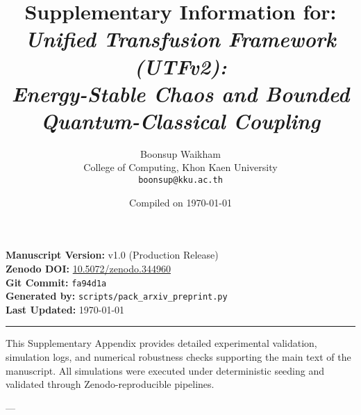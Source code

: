 
\title{\textbf{Supplementary Information for:}\\
\emph{Unified Transfusion Framework (UTFv2):\\
Energy-Stable Chaos and Bounded Quantum-Classical Coupling}}

\author{
Boonsup Waikham \\
\small College of Computing, Khon Kaen University \\
\small \texttt{boonsup@kku.ac.th}
}

\date{Compiled on \today}


\maketitle
\thispagestyle{plain}

\noindent
\textbf{Manuscript Version:} v1.0 (Production Release) \\
\textbf{Zenodo DOI:} \href{https://handle.test.datacite.org/10.5072/zenodo.344960}{10.5072/zenodo.344960} \\
\textbf{Git Commit:} \texttt{fa94d1a} \\  %
\textbf{Generated by:} \texttt{scripts/pack\_arxiv\_preprint.py} \\
\textbf{Last Updated:} \today
\vspace{1em}
\hrule
\vspace{1em}

\noindent
This Supplementary Appendix provides detailed experimental validation, simulation logs,
and numerical robustness checks supporting the main text of the manuscript.
All simulations were executed under deterministic seeding and validated
through Zenodo-reproducible pipelines.

---

\setcounter{figure}{0}
\renewcommand{\thefigure}{S\arabic{figure}}



